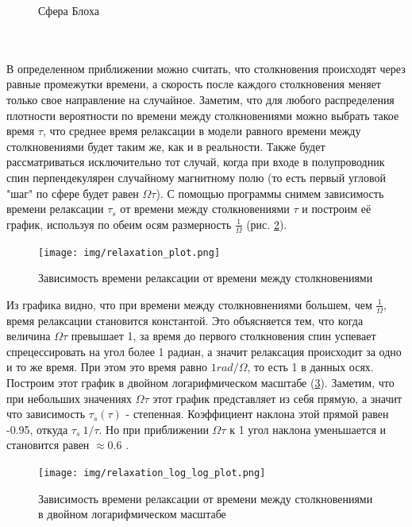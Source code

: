 \documentclass[12pt,oneside]{book}
\begin{document}
{{\begin{figure}[h!]
		\caption{Сфера Блоха}
		\label{fig:f2}
	\end{figure} 
	\\
	\\
 	В определенном приближении можно считать, что столкновения происходят через равные промежутки времени, а скорость после каждого столкновения меняет только свое направление на случайное. Заметим, что для любого распределения плотности вероятности по времени между столкновениями можно выбрать такое время $\tau$, что среднее время релаксации в модели равного времени между столкновениями будет таким же, как и в реальности. Также будет рассматриваться исключительно тот случай, когда при входе в полупроводник спин перпендекулярен случайному магнитному полю (то есть первый угловой "шаг" по сфере будет равен ${\Omega}{\tau}$).
	\newline
	\newline
	С помощью программы снимем зависимость времени релаксации $\tau_s$ от времени между столкновениями $\tau$ и построим её график, используя по обеим осям размерность $\frac{1}{\Omega}$ (рис. \ref{fig:f3}).
	\begin{figure}[h!]
		\centering
		\texttt{[image: img/relaxation\_plot.png]}
		\caption{Зависимость времени релаксации от времени между столкновениями}
		\label{fig:f3}
	\end{figure} 
	Из графика видно, что при времени между столкновнениями большем, чем $\frac{1}{\Omega}$, время релаксации становится константой. Это объясняется тем, что когда величина ${\Omega}{\tau}$ превышает 1, за время до первого столкновения спин успевает спрецессировать на угол более 1 радиан, а значит релаксация происходит за одно и то же время. При этом это время равно  ${1 rad/\Omega}$, то есть 1 в данных осях.
	\newline
	Построим этот график в двойном логарифмическом масштабе (\ref{fig:f4}). Заметим, что при небольших значениях  ${\Omega}{\tau}$ этот график представляет из себя прямую, а значит что зависимость  $\tau_s(\tau)$ - степенная. Коэффициент наклона этой прямой равен -0.95, откуда  $\tau_s ~ 1/\tau$. Но при приближении ${\Omega}{\tau}$ к 1 угол наклона уменьшается и становится равен $\approx 0.6$ .
	\begin{figure}[h!]
		\centering
		\texttt{[image: img/relaxation\_log\_log\_plot.png]}
		\caption{Зависимость времени релаксации от времени между столкновениями в двойном логарифмическом масштабе}
		\label{fig:f4}
	\end{figure}
}}
\end{document}
